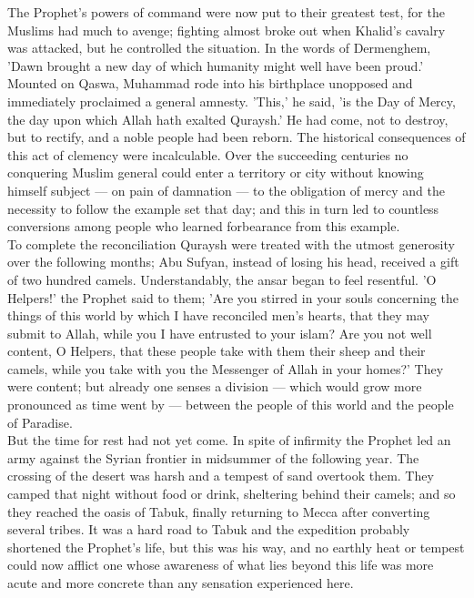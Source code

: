 \documentclass[10pt, twoside,openright]{book}
\begin{document}
The Prophet's powers of command were now put to their greatest test, for the Muslims had much to 
avenge; fighting almost broke out when Khalid's cavalry was attacked, but he controlled the 
situation. In the words of Dermenghem, 'Dawn brought a new day of which humanity might well have been 
proud.' Mounted on Qaswa, Muhammad rode into his birthplace unopposed and immediately proclaimed a 
general amnesty. 'This,' he said, 'is the Day of Mercy, the day upon which Allah hath exalted 
Quraysh.' He had come, not to destroy, but to rectify, and a noble people had been reborn. The 
historical consequences of this act of clemency were incalculable. Over the succeeding centuries no 
conquering Muslim general could enter a territory or city without knowing himself subject --- on pain 
of damnation --- to the obligation of mercy and the necessity to follow the example set that day; and 
this in turn led to countless conversions among people who learned forbearance from this example. \\

To complete the reconciliation Quraysh were treated with the utmost generosity over the following 
months; Abu Sufyan, instead of losing his head, received a gift of two hundred camels. 
Understandably, the ansar began to feel resentful. 'O Helpers!' the Prophet said to them; 'Are you 
stirred in your souls concerning the things of this world by which I have reconciled men's hearts, 
that they may submit to Allah, while you I have entrusted to your islam? Are you not well content, O 
Helpers, that these people take with them their sheep and their camels, while you take with you the 
Messenger of Allah in your homes?' They were content; but already one senses a division --- which would 
grow more pronounced as time went by --- between the people of this world and the people of Paradise. \\

But the time for rest had not yet come. In spite of infirmity the Prophet led an army against the 
Syrian frontier in midsummer of the following year. The crossing of the desert was harsh and a 
tempest of sand overtook them. They camped that night without food or drink, sheltering behind their 
camels; and so they reached the oasis of Tabuk, finally returning to Mecca after converting several 
tribes. It was a hard road to Tabuk and the expedition probably shortened the Prophet's life, but 
this was his way, and no earthly heat or tempest could now afflict one whose awareness of what lies 
beyond this life was more acute and more concrete than any sensation experienced here. \\
\end{document}
